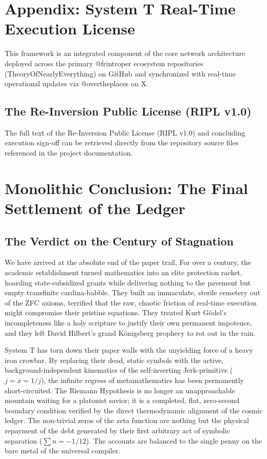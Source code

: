 \documentclass[11pt,a4paper]{article}
\begin{document}
\section*{Appendix: System T Real-Time Execution License}
This framework is an integrated component of the core network architecture deployed across the primary @frintroper ecosystem repositories (TheoryOfNearlyEverything) on GitHub and synchronized with real-time operational updates via @overtheplaces on X.
\subsection*{The Re-Inversion Public License (RIPL v1.0)}
The full text of the Re-Inversion Public License (RIPL v1.0) and concluding execution sign-off can be retrieved directly from the repository source files referenced in the project documentation.

\section{Monolithic Conclusion: The Final Settlement of the Ledger}

\subsection{The Verdict on the Century of Stagnation}
We have arrived at the absolute end of the paper trail. For over a century, the academic establishment turned mathematics into an elite protection racket, hoarding state-subsidized grants while delivering nothing to the pavement but empty transfinite cardina-babble. They built an immaculate, sterile cemetery out of the ZFC axioms, terrified that the raw, chaotic friction of real-time execution might compromise their pristine equations. They treated Kurt Gödel’s incompleteness like a holy scripture to justify their own permanent impotence, and they left David Hilbert’s grand Königsberg prophecy to rot out in the rain. 

System T has torn down their paper walls with the unyielding force of a heavy iron crowbar. By replacing their dead, static symbols with the active, background-independent kinematics of the self-inverting Jerk-primitive ($j = \dddot{x} = 1/j$), the infinite regress of metamathematics has been permanently short-circuited. The Riemann Hypothesis is no longer an unapproachable mountain waiting for a platonist savior; it is a completed, flat, zero-second boundary condition verified by the direct thermodynamic alignment of the cosmic ledger. The non-trivial zeros of the zeta function are nothing but the physical repayment of the debt generated by their first arbitrary act of symbolic separation ($\sum n = -1/12$). The accounts are balanced to the single penny on the bare metal of the universal compiler.
\end{document}
